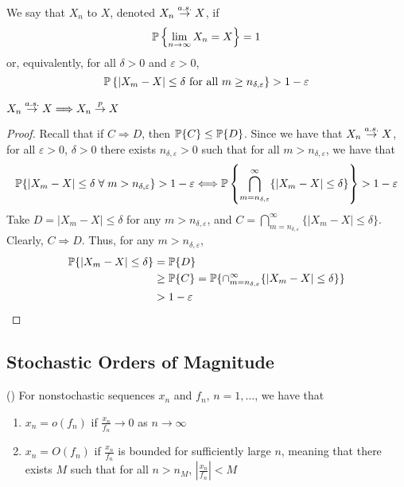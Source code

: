 \documentclass[10pt]{article}
\begin{document}
\begin{definition}
	We say that $X_n$  to $X$, denoted $X_n \overset{a.s.}{\to} X$, if
	\[
	\mathbb{P}\left\{ \lim_{n\to\infty} X_n = X \right\} = 1
	\]
	or, equivalently, for all $\delta > 0$ and $\varepsilon > 0$,
	\[
	\mathbb{P}\left\{ |X_m - X| \le \delta \text{ for all } m \ge n_{\delta,\varepsilon}\right\} > 1 - \varepsilon
	\]
\end{definition}

\begin{theorem}
	$X_n \overset{a.s.}{\to} X \Longrightarrow X_n \overset{p}{\to} X$
\end{theorem}
\begin{proof}
	Recall that if $C \Rightarrow D$, then $\mathbb{P}\{C\} \le \mathbb{P}\{D\}$. Since we have that $X_n \overset{a.s.}{\to} X$, for all $\varepsilon > 0$, $\delta > 0$ there exists $n_{\delta,\varepsilon} > 0$ such that for all $m > n_{\delta,\varepsilon}$, we have that
	\[
	\prob \{|X_m - X| \le \delta \forall m > n_{\delta,\varepsilon}\} > 1-\varepsilon \Longleftrightarrow \prob \curll \bigcap_{m = n_{\delta,\varepsilon}}^\infty \{|X_m - X| \le \delta \} \curlr > 1 - \varepsilon
	\]
	Take $D = |X_m - X| \le \delta$ for any $m > n_{\delta,\varepsilon}$, and $C = \bigcap_{m=n_{\delta,\varepsilon}}^\infty \{|X_m - X| \le \delta \}$. Clearly, $C \Longrightarrow D$. Thus, for any $m > n_{\delta,\varepsilon}$,
	\begin{align*}
		\mathbb{P}\{|X_m - X| \le \delta\} &= \mathbb{P}\{D\} \\
		&\ge \mathbb{P}\{C\} = \mathbb{P}\{\cap_{m = n_{\delta,\varepsilon}}^\infty \{|X_m - X| \le \delta\}\} \\
		&> 1-\varepsilon
	\end{align*}
\end{proof}


\subsection{Stochastic Orders of Magnitude}

\begin{definition}
	() For nonstochastic sequences $x_n$ and $f_n$, $n = 1,\dots$, we have that
	\begin{enumerate}
		\item $x_n = o(f_n)$ if $\frac{x_n}{f_n} \to 0$ as $n \to \infty$
		\item $x_n = O(f_n)$ if $\frac{x_n}{f_n}$ is bounded for sufficiently large $n$, meaning that there exists $M$ such that for all $n > n_M$, $|\frac{x_n}{f_n}| < M$
	\end{enumerate}
\end{definition}
\end{document}
